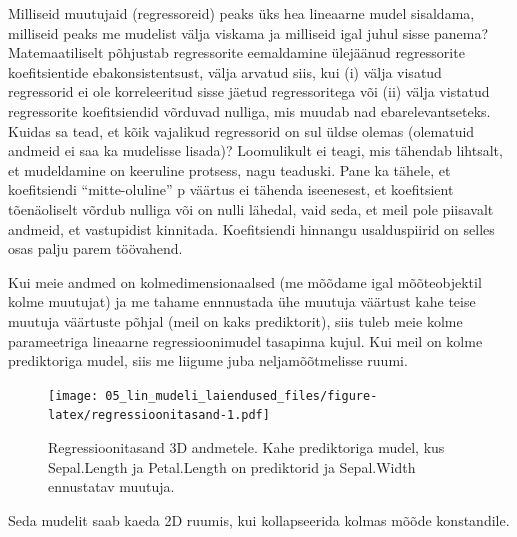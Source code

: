 \documentclass[]{book}
\begin{document}
Milliseid muutujaid (regressoreid) peaks üks hea lineaarne mudel sisaldama, milliseid peaks me mudelist välja viskama ja milliseid igal juhul sisse panema?
Matemaatiliselt põhjustab regressorite eemaldamine ülejäänud regressorite koefitsientide ebakonsistentsust, välja arvatud siis, kui (i) välja visatud regressorid ei ole korreleeritud sisse jäetud regressoritega või (ii) välja vistatud regressorite koefitsiendid võrduvad nulliga, mis muudab nad ebarelevantseteks. Kuidas sa tead, et kõik vajalikud regressorid on sul üldse olemas (olematuid andmeid ei saa ka mudelisse lisada)? Loomulikult ei teagi, mis tähendab lihtsalt, et mudeldamine on keeruline protsess, nagu teaduski. Pane ka tähele, et koefitsiendi ``mitte-oluline'' p väärtus ei tähenda iseenesest, et koefitsient tõenäoliselt võrdub nulliga või on nulli lähedal, vaid seda, et meil pole piisavalt andmeid, et vastupidist kinnitada. Koefitsiendi hinnangu usalduspiirid on selles osas palju parem töövahend.

Kui meie andmed on kolmedimensionaalsed (me mõõdame igal mõõteobjektil kolme muutujat) ja me tahame ennnustada ühe muutuja väärtust kahe teise muutuja väärtuste põhjal (meil on kaks prediktorit), siis tuleb meie kolme parameetriga lineaarne regressioonimudel tasapinna kujul.
Kui meil on kolme prediktoriga mudel, siis me liigume juba neljamõõtmelisse ruumi.



\begin{figure}
\centering
\texttt{[image: 05\_lin\_mudeli\_laiendused\_files/figure-latex/regressioonitasand-1.pdf]}
\caption{\label{fig:regressioonitasand}Regressioonitasand 3D andmetele. Kahe prediktoriga mudel, kus Sepal.Length ja Petal.Length on prediktorid ja Sepal.Width ennustatav muutuja.}
\end{figure}

Seda mudelit saab kaeda 2D ruumis, kui kollapseerida kolmas mõõde konstandile.
\end{document}
